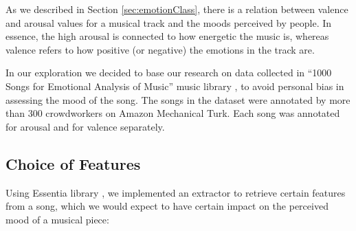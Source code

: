 As we described in Section \ref{sec:emotionClass}, there is a relation between valence and arousal values for a musical track and the moods perceived by people. In essence, the high arousal is connected to how energetic the music is, whereas valence refers to how positive (or negative) the emotions in the track are. 

In our exploration we decided to base our research on data collected in ``1000 Songs for Emotional Analysis of Music'' music library \cite{1000songs}, to avoid personal bias in assessing the mood of the song. The songs in the dataset were annotated by more than 300 crowdworkers on Amazon Mechanical Turk. Each song was annotated for arousal and for valence separately.

\vspace{10pt}

\subsection{Choice of Features}
Using Essentia library \cite{essentia}, we implemented an extractor to retrieve certain features from a song, which we would expect to have certain impact on the perceived mood of a musical piece:

